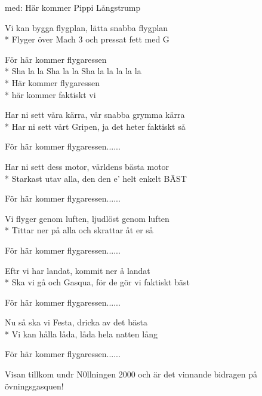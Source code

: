 \begin{SongText}
    \begin{SongInfo}
        med: Här kommer Pippi Långstrump
    \end{SongInfo}
    \begin{SongVerse}
        Vi kan bygga flygplan, lätta snabba flygplan\\*%
        Flyger över Mach 3 och pressat fett med G
    \end{SongVerse}
    \begin{SongVerse}
        För här kommer flygaressen\\*%
        Sha la la Sha la la Sha la la la la la\\*%
        Här kommer flygaressen\\*%
        här kommer faktiskt vi
    \end{SongVerse}
    \begin{SongVerse}
        Har ni sett våra kärra, vår snabba grymma kärra\\*%
        Har ni sett vårt Gripen, ja det heter faktiskt så
    \end{SongVerse}
    \begin{SongVerse}
        För här kommer flygaressen......
    \end{SongVerse}
    \begin{SongVerse}
        Har ni sett dess motor, världens bästa motor\\*%
        Starkast utav alla, den den e' helt enkelt BÄST
    \end{SongVerse}
    \begin{SongVerse}
        För här kommer flygaressen......
    \end{SongVerse}
    \begin{SongVerse}
        Vi flyger genom luften, ljudlöst genom luften\\*%
        Tittar ner på alla och skrattar åt er så
    \end{SongVerse}
    \begin{SongVerse}
        För här kommer flygaressen......
    \end{SongVerse}
    \begin{SongVerse}
        Eftr vi har landat, kommit ner å landat\\*%
        Ska vi gå och Gasqua, för de gör vi faktiskt bäst
    \end{SongVerse}
    \begin{SongVerse}
        För här kommer flygaressen......
    \end{SongVerse}
    \begin{SongVerse}
        Nu så ska vi Festa, dricka av det bästa\\*%
        Vi kan hålla låda, låda hela natten lång
    \end{SongVerse}
    \begin{SongVerse}
        För här kommer flygaressen......
    \end{SongVerse}
    \begin{SongInfo}
        Visan tillkom undr N0llningen 2000 och är det vinnande bidragen på övningsgasquen!
    \end{SongInfo}
\end{SongText}
